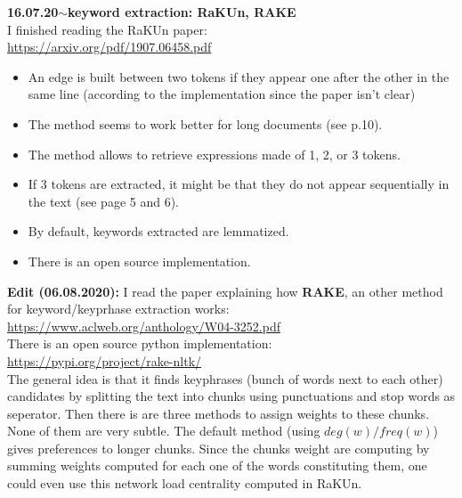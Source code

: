 \documentclass[11pt,a4paper]{article}
\newenvironment{loggentry}[2]%
{\noindent\textbf{#1}\hspace{1cm}$\mathbf{\sim}$\text{ }\textbf{#2}\\}{\vspace{0.5cm}}
\begin{document}
\begin{loggentry}{16.07.20}{keyword extraction: RaKUn, RAKE}

I finished reading the RaKUn paper:\\
\url{https://arxiv.org/pdf/1907.06458.pdf}\\
\begin{itemize}
\item An edge is built between two tokens if they appear one after the other in the same line (according to the implementation since the paper isn't clear)
\item The method seems to work better for long documents (see p.10).
\item The method allows to retrieve expressions made of 1, 2, or 3 tokens.
\item If 3 tokens are extracted, it might be that they do not appear sequentially in the text (see page 5 and 6).
\item By default, keywords extracted are lemmatized.
\item There is an open source implementation.
\end{itemize}

\textbf{Edit (06.08.2020):} I read the paper explaining how \textbf{RAKE}, an other method for keyword/keyprhase extraction works:\\
\url{https://www.aclweb.org/anthology/W04-3252.pdf}\\
There is an open source python implementation:\\
\url{https://pypi.org/project/rake-nltk/}\\
The general idea is that it finds keyphrases (bunch of words next to each other) candidates by splitting the text into chunks using punctuations and stop words as seperator. Then there is are three methods to assign weights to these chunks. None of them are very subtle. The default method (using $deg(w)/freq(w)$) gives preferences to longer chunks. Since the chunks weight are computing by summing weights computed for each one of the words constituting them, one could even use this network load centrality computed in RaKUn.

\end{loggentry}
\end{document}
